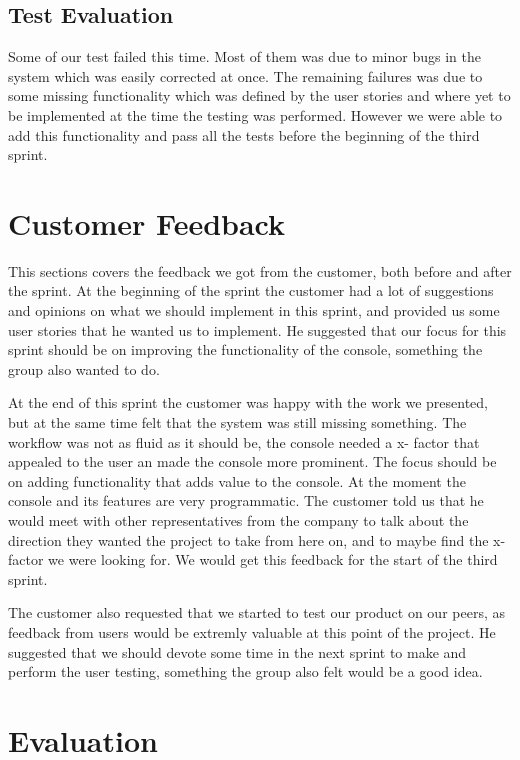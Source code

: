 \subsection{Test Evaluation}
Some of our test failed this time. Most of them was due to minor bugs in the system which was easily corrected at once. The remaining failures was due to some missing functionality which was defined by the user stories and where yet to be implemented at the time the testing was performed. However we were able to add this functionality and pass all the tests before the beginning of the third sprint.

\section{Customer Feedback}
This sections covers the feedback we got from the customer, both before and after the sprint.
\newline
\newline
At the beginning of the sprint the customer had a lot of suggestions and opinions on what we should implement in this sprint, and provided us some user stories that he wanted us to implement. He suggested that our focus for this sprint should be on improving the functionality of the console, something the group also wanted to do. 

At the end of this sprint the customer was happy with the work we presented, but at the same time felt that the system was still missing something. The workflow was not as fluid as it should be, the console needed a x- factor that appealed to the user an made the console more prominent. The focus should be on adding functionality that adds value to the console. At the moment the console and its features are very programmatic. The customer told us that he would meet with other representatives from the company to talk about the direction they wanted the project to take from here on, and to maybe find the x- factor we were looking for. We would get this feedback for the start of the third sprint.

The customer also requested that we started to test our product on our peers, as feedback from users would be extremly valuable at this point of the project. He suggested that we should devote some time in the next sprint to make and perform the user testing, something the group also felt would be a good idea.

\section{Evaluation}

